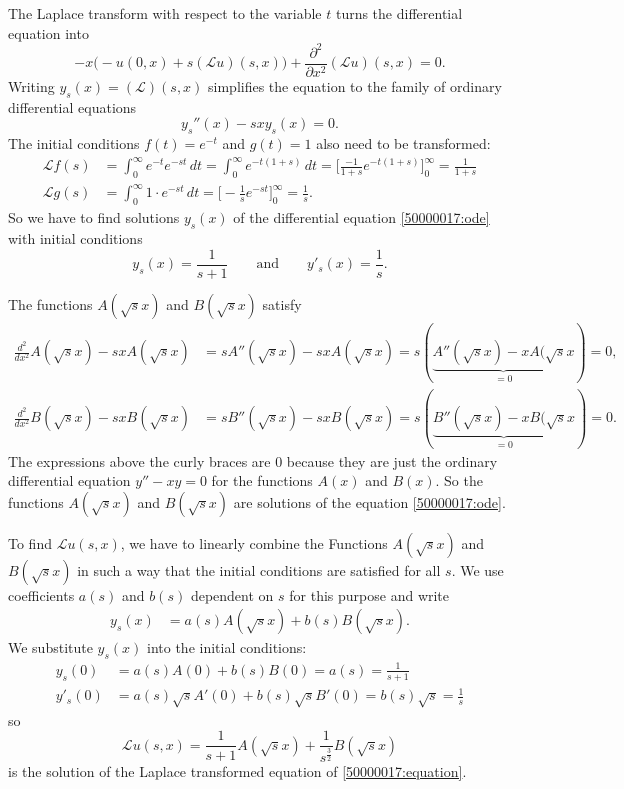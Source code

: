 \begin{loesung}
\begin{teilaufgaben}
\item
The Laplace transform with respect to the variable $t$ turns the differential
equation into
\[
-
x\biggl(
-u(0,x) + s(\mathscr{L}u)(s,x)
\biggr)
+\frac{\partial^2}{\partial x^2} (\mathscr{L}u)(s,x)
=
0.
\]
Writing $y_s(x) = (\mathscr{L})(s,x)$ simplifies the equation to
the family of ordinary differential equations
\begin{equation}
y_s''(x)  -sxy_s(x) = 0.
\label{50000017:ode}
\end{equation}
The initial conditions $f(t)=e^{-t}$ and $g(t)=1$ also need to be transformed:
\begin{align*}
\mathscr{L}f(s)
&=
\int_0^\infty e^{-t} e^{-st}\,dt
=
\int_0^\infty e^{-t(1+s)} \,dt
=
\biggl[
\frac{-1}{1+s}e^{-t(1+s)}
\biggr]_0^\infty
=
\frac1{1+s}
\\
\mathscr{L}g(s)
&=
\int_0^\infty 1\cdot e^{-st}\,dt
=
\biggl[ -\frac1se^{-st}\biggr]_0^\infty
=
\frac1s.
\end{align*}
So we have to find solutions $y_s(x)$ of the differential equation
\eqref{50000017:ode} with initial conditions
\[
y_s(x) = \frac1{s+1}
\qquad
\text{and}
\qquad
y'_s(x) = \frac{1}{s}.
\]
\item
The functions $A(\sqrt{s}x)$ and $B(\sqrt{s}x)$ satisfy
\begin{align*}
\frac{d^2}{dx^2}A(\sqrt{s}x)
-
sxA(\sqrt{s}x)
&=
sA''(\sqrt{s}x)-sxA(\sqrt{s}x)
=
s(\underbrace{A''(\sqrt{s}x)-xA(\sqrt{s}x}_{\displaystyle=0})
=
0,
\\
\frac{d^2}{dx^2}B(\sqrt{s}x)
-
sxB(\sqrt{s}x)
&=
sB''(\sqrt{s}x)-sxB(\sqrt{s}x)
=
s(\underbrace{B''(\sqrt{s}x)-xB(\sqrt{s}x}_{\displaystyle=0})
=
0.
\end{align*}
The expressions above the curly braces are $0$ because they are just
the ordinary 
differential equation $y''-xy=0$ for the functions $A(x)$ and $B(x)$.
So the functions $A(\sqrt{s}x)$ and $B(\sqrt{s}x)$ are solutions of
the equation \eqref{50000017:ode}.
\item
To find $\mathscr{L}u(s,x)$, we have to linearly combine the
Functions $A(\sqrt{s}x)$ and $B(\sqrt{s}x)$ in such a way that the
initial conditions are satisfied for all $s$.
We use coefficients $a(s)$ and $b(s)$  dependent on $s$ for this purpose
and write 
\begin{align*}
y_s(x)
&=
a(s)
A(\sqrt{s}x) +
b(s)
B(\sqrt{s}x).
\end{align*}
We substitute $y_s(x)$ into the initial conditions:
\begin{align*}
y_s(0) &= a(s) A(0) + b(s) B(0) = a(s) = \frac{1}{s+1}
\\
y'_s(0)&= a(s)\sqrt{s}A'(0) + b(s) \sqrt{s}B'(0) = b(s)\sqrt{s} = \frac{1}{s}
\end{align*}
so
\[
\mathscr{L}u(s,x)
=
\frac1{s+1} A(\sqrt{s}x)
+
\frac{1}{s^{\frac32}} B(\sqrt{s}x)
\]
is the solution of the Laplace transformed equation of
\eqref{50000017:equation}.
\qedhere
\end{teilaufgaben}
\end{loesung}

